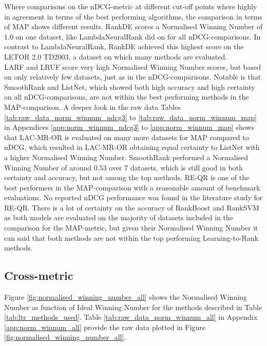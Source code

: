Where comparisons on the \ac{nDCG}-metric at different cut-off points where highly in agreement in terms of the best performing algorithms, the comparison in terms of \ac{MAP} shows different results. RankDE scores a Normalised Winning Number of 1.0 on one dataset, like LambdaNeuralRank did on for all \ac{nDCG}-comparisons. In contrast to LambdaNeuralRank, RankDE achieved this highest score on the LETOR 2.0 TD2003, a dataset on which many methods are evaluated.\\

LARF and LRUF score very high Normalised Winning Number scores, but based on only relatively few datasets, just as in the \ac{nDCG}-comparisons. Notable is that SmoothRank and ListNet, which showed both high accuracy and high certainty on all \ac{nDCG}-comparisons, are not within the best performing methods in the \ac{MAP}-comparison. A deeper look in the raw data Tables \ref{tab:raw_data_norm_winnum_ndcg3} to \ref{tab:raw_data_norm_winnum_map} in Appendices \ref{app:norm_winnum_ndcg3} to \ref{app:norm_winnum_map} shows that LAC-MR-OR is evaluated on many more datasets for \ac{MAP} compared to \ac{nDCG}, which resulted in LAC-MR-OR obtaining equal certainty to ListNet with a higher Normalised Winning Number. SmoothRank performed a Normalised Winning Number of around 0.53 over 7 datasets, which is still good in both certainty and accuracy, but not among the top methods. RE-QR is one of the best performers in the \ac{MAP}-comparison with a reasonable amount of benchmark evaluations. No reported \ac{nDCG} performance was found in the literature study for RE-QR. There is a lot of certainty on the accuracy of RankBoost and Rank\ac{SVM} as both models are evaluated on the majority of datasets included in the comparison for the \ac{MAP}-metric, but given their Normalised Winning Number it can said that both methods are not within the top performing Learning-to-Rank methods.

\subsection{Cross-metric}
Figure \ref{fig:normalised_winning_number_all} shows the Normalised Winning Number as function of Ideal Winning Number for the methods described in Table \ref{tab:ltr_methods_used}. Table \ref{tab:raw_data_norm_winnum_all} in Appendix \ref{app:norm_winnum_all} provide the raw data plotted in Figure \ref{fig:normalised_winning_number_all}.\\


